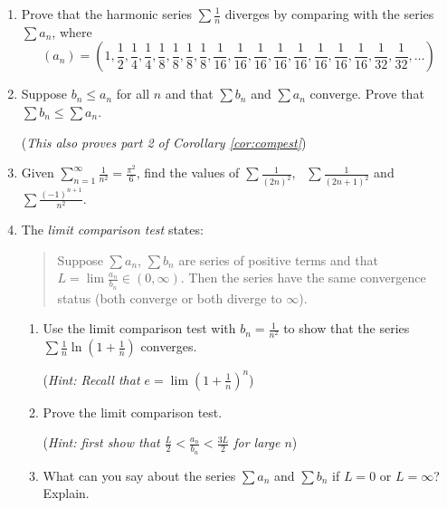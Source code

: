 \begin{exercises}{}{}
\begin{enumerate}
	  
	  \item%
	  Prove that the harmonic series $\sum\frac 1n$ diverges by comparing with the series $\sum a_n$, where
	  \[
	  	(a_n)=\textstyle
	  	\left(1,\frac 12,\frac 14,\frac 14,\frac 18,\frac 18,\frac 18,\frac 18,
	  	\frac 1{16},\frac 1{16},\frac 1{16},\frac 1{16},
	  	\frac 1{16},\frac 1{16},\frac 1{16},\frac 1{16},
	  	\frac 1{32},\frac 1{32},\ldots\right)
	  \]
	  
	  
	  \item Suppose $b_n\le a_n$ for all $n$ and that $\sum b_n$ and $\sum a_n$ converge. Prove that $\sum b_n\le \sum a_n$.\par
	  (\emph{This also proves part 2 of Corollary \ref{cor:compest}})

	
		\item Given $\sum_{n=1}^\infty\frac 1{n^2}=\frac{\pi^2}6$, find the values of $\sum \frac 1{(2n)^2}$, \ $\sum\frac 1{(2n+1)^2}$ and $\sum\frac{(-1)^{n+1}}{n^2}$.

	
		\item The \emph{limit comparison test} states:
	  \begin{quote}
	  	Suppose $\sum a_n$, $\sum b_n$ are series of positive terms and that $L=\lim\frac{a_n}{b_n}\in(0,\infty)$. Then the series have the same convergence status (both converge or both diverge to $\infty$).
	  \end{quote}
	  \begin{enumerate}
	    \item Use the limit comparison test with $b_n=\frac 1{n^2}$ to show that the series $\sum\frac 1n\ln\left(1+\frac 1n\right)$ converges.\par
	    (\emph{Hint: Recall that $e=\lim\left(1+\frac 1n\right)^n$})
	    	
	    \item Prove the limit comparison test.\par
	    (\emph{Hint: first show that $\frac L2<\frac{a_n}{b_n}<\frac{3L}2$ for large $n$})
	    	
	    \item What can you say about the series $\sum a_n$ and $\sum b_n$ if $L=0$ or $L=\infty$? Explain.
	  \end{enumerate}
  

\end{enumerate}
\end{exercises}
